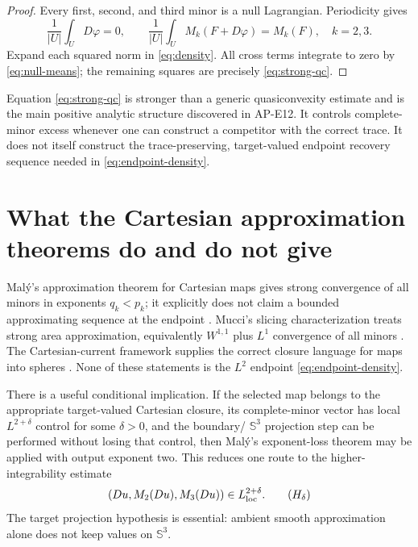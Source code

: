 \documentclass[11pt]{article}
\begin{document}
\begin{proof}
Every first, second, and third minor is a null Lagrangian.  Periodicity gives
\begin{equation}
 \frac1{|U|}\int_U D\varphi=0,\qquad
 \frac1{|U|}\int_U M_k(F+D\varphi)=M_k(F),\quad k=2,3.
 \label{eq:null-means}
\end{equation}
Expand each squared norm in \eqref{eq:density}.  All cross terms integrate to
zero by \eqref{eq:null-means}; the remaining squares are precisely
\eqref{eq:strong-qc}.
\end{proof}

Equation \eqref{eq:strong-qc} is stronger than a generic quasiconvexity
estimate and is the main positive analytic structure discovered in AP-E12.
It controls complete-minor excess whenever one can construct a competitor
with the correct trace.  It does not itself construct the trace-preserving,
target-valued endpoint recovery sequence needed in
\eqref{eq:endpoint-density}.

\section{What the Cartesian approximation theorems do and do not give}

Mal\'y's approximation theorem for Cartesian maps gives strong convergence
of all minors in exponents $q_k<p_k$; it explicitly does not claim a bounded
approximating sequence at the endpoint \cite{Maly1991}.  Mucci's slicing
characterization treats strong area approximation, equivalently
$W^{1,1}$ plus $L^1$ convergence of all minors \cite{Mucci2001}.  The
Cartesian-current framework supplies the correct closure language for maps
into spheres \cite{GiaquintaModicaSoucek1989}.  None of these statements is
the $L^2$ endpoint \eqref{eq:endpoint-density}.

There is a useful conditional implication.  If the selected map belongs to
the appropriate target-valued Cartesian closure, its complete-minor vector
has local $L^{2+\delta}$ control for some $\delta>0$, and the boundary/
$\mathbb S^3$ projection step can be performed without losing that control,
then Mal\'y's exponent-loss theorem may be applied with output exponent two.
This reduces one route to the higher-integrability estimate
\begin{equation}
 (Du,M_2(Du),M_3(Du))\in L^{2+\delta}_{\rm loc}.
 \qquad(H_\delta)\label{eq:higher-int}
\end{equation}
The target projection hypothesis is essential: ambient smooth approximation
alone does not keep values on $\mathbb S^3$.
\end{document}
